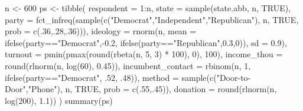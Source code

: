 \documentclass[
  letterpaper,
  DIV=11,
  numbers=noendperiod]{scrreprt}
\newenvironment{Shaded}{\begin{snugshade}}{\end{snugshade}}
\newcommand{\AttributeTok}[1]{\textcolor[rgb]{0.40,0.45,0.13}{#1}}
\newcommand{\ConstantTok}[1]{\textcolor[rgb]{0.56,0.35,0.01}{#1}}
\newcommand{\DecValTok}[1]{\textcolor[rgb]{0.68,0.00,0.00}{#1}}
\newcommand{\FloatTok}[1]{\textcolor[rgb]{0.68,0.00,0.00}{#1}}
\newcommand{\FunctionTok}[1]{\textcolor[rgb]{0.28,0.35,0.67}{#1}}
\newcommand{\NormalTok}[1]{\textcolor[rgb]{0.00,0.23,0.31}{#1}}
\newcommand{\OtherTok}[1]{\textcolor[rgb]{0.00,0.23,0.31}{#1}}
\newcommand{\SpecialCharTok}[1]{\textcolor[rgb]{0.37,0.37,0.37}{#1}}
\newcommand{\StringTok}[1]{\textcolor[rgb]{0.13,0.47,0.30}{#1}}
\begin{document}
\begin{Shaded}
\begin{Highlighting}[]
\NormalTok{n }\OtherTok{\textless{}{-}} \DecValTok{600}
\NormalTok{ps }\OtherTok{\textless{}{-}} \FunctionTok{tibble}\NormalTok{(}
  \AttributeTok{respondent =} \DecValTok{1}\SpecialCharTok{:}\NormalTok{n,}
  \AttributeTok{state =} \FunctionTok{sample}\NormalTok{(state.abb, n, }\ConstantTok{TRUE}\NormalTok{),}
  \AttributeTok{party =} \FunctionTok{fct\_infreq}\NormalTok{(}\FunctionTok{sample}\NormalTok{(}\FunctionTok{c}\NormalTok{(}\StringTok{"Democrat"}\NormalTok{,}\StringTok{"Independent"}\NormalTok{,}\StringTok{"Republican"}\NormalTok{), n, }\ConstantTok{TRUE}\NormalTok{, }\AttributeTok{prob =} \FunctionTok{c}\NormalTok{(.}\DecValTok{36}\NormalTok{,.}\DecValTok{28}\NormalTok{,.}\DecValTok{36}\NormalTok{))),}
  \AttributeTok{ideology =} \FunctionTok{rnorm}\NormalTok{(n, }\AttributeTok{mean =} \FunctionTok{ifelse}\NormalTok{(party}\SpecialCharTok{==}\StringTok{"Democrat"}\NormalTok{,}\SpecialCharTok{{-}}\FloatTok{0.2}\NormalTok{, }\FunctionTok{ifelse}\NormalTok{(party}\SpecialCharTok{==}\StringTok{"Republican"}\NormalTok{,}\FloatTok{0.3}\NormalTok{,}\DecValTok{0}\NormalTok{)), }\AttributeTok{sd =} \FloatTok{0.9}\NormalTok{),}
  \AttributeTok{turnout =} \FunctionTok{pmin}\NormalTok{(}\FunctionTok{pmax}\NormalTok{(}\FunctionTok{round}\NormalTok{(}\FunctionTok{rbeta}\NormalTok{(n, }\DecValTok{5}\NormalTok{, }\DecValTok{3}\NormalTok{) }\SpecialCharTok{*} \DecValTok{100}\NormalTok{), }\DecValTok{0}\NormalTok{), }\DecValTok{100}\NormalTok{),}
  \AttributeTok{income\_thou =} \FunctionTok{round}\NormalTok{(}\FunctionTok{rlnorm}\NormalTok{(n, }\FunctionTok{log}\NormalTok{(}\DecValTok{60}\NormalTok{), }\FloatTok{0.45}\NormalTok{)),}
  \AttributeTok{incumbent\_contact =} \FunctionTok{rbinom}\NormalTok{(n, }\DecValTok{1}\NormalTok{, }\FunctionTok{ifelse}\NormalTok{(party}\SpecialCharTok{==}\StringTok{"Democrat"}\NormalTok{, .}\DecValTok{52}\NormalTok{, .}\DecValTok{48}\NormalTok{)),}
  \AttributeTok{method =} \FunctionTok{sample}\NormalTok{(}\FunctionTok{c}\NormalTok{(}\StringTok{"Door{-}to{-}Door"}\NormalTok{,}\StringTok{"Phone"}\NormalTok{), n, }\ConstantTok{TRUE}\NormalTok{, }\AttributeTok{prob =} \FunctionTok{c}\NormalTok{(.}\DecValTok{55}\NormalTok{,.}\DecValTok{45}\NormalTok{)),}
  \AttributeTok{donation =} \FunctionTok{round}\NormalTok{(}\FunctionTok{rlnorm}\NormalTok{(n, }\FunctionTok{log}\NormalTok{(}\DecValTok{200}\NormalTok{), }\FloatTok{1.1}\NormalTok{))}
\NormalTok{)}
\FunctionTok{summary}\NormalTok{(ps)}
\end{Highlighting}
\end{Shaded}
\end{document}
